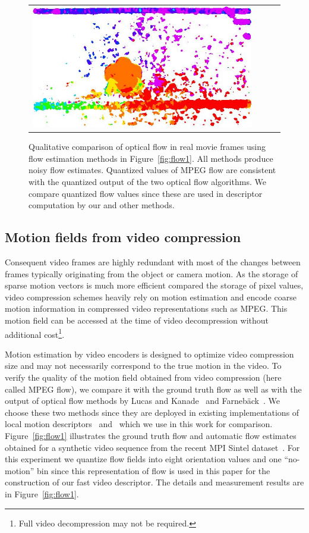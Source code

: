 \begin{figure}[t!]
\begin{center}
\begin{tabular}{cccc}
\includegraphics[width=.23\textwidth]{cvpr14_figures/flow/flow_actioncliptest00870_frame013_traj_quant.jpeg} \vspace{.2cm}\\
\end{tabular}
\caption[Qualitative comparison of optical flow]{Qualitative comparison of optical flow in real movie frames using flow estimation methods in Figure~\ref{fig:flow1}. All methods produce noisy flow estimates. Quantized values of MPEG flow are consistent with the quantized output of the two optical flow algorithms. We compare quantized flow values since these are used in descriptor computation by our and other methods.\vspace{-.3cm}}
\label{fig:flow2}
\end{center}
\end{figure}



\subsection{Motion fields from video compression}
Consequent video frames are highly redundant with most of the changes between frames typically originating from the object or camera motion. As the storage of sparse motion vectors is much more efficient compared the storage of pixel values, video compression schemes heavily rely on motion estimation and encode coarse motion information in compressed video representations such as MPEG. This motion field can be accessed at the time of video decompression without additional cost\footnote{Full video decompression may not be required.}. %

Motion estimation by video encoders is designed to optimize video compression size and may not necessarily correspond to the true motion in the video. To verify the quality of the motion field obtained from video compression (here called MPEG flow), we compare it with the ground truth flow as well as with the output of optical flow methods by Lucas and Kanade~\cite{Lucas81} and Farneb\"ack~\cite{Farneback03}. We choose these two methods since they are deployed in existing implementations of local motion descriptors~\cite{Laptev08} and~\cite{Wang12} which we use in this work for comparison. Figure~\ref{fig:flow1} illustrates the ground truth flow and automatic flow estimates obtained for a synthetic video sequence from the recent MPI Sintel dataset~\cite{Butler12}. For this experiment we quantize flow fields into eight orientation values and one ``no-motion'' bin since this representation of flow is used in this paper for the construction of our fast video descriptor. The details and measurement results are in Figure~\ref{fig:flow1}.

